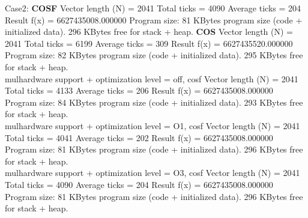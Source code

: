 Case2: 
\textbf{COSF}
Vector length (N)     = 2041
Total ticks           = 4090
Average ticks         = 204
Result f(x)           = 6627435008.000000
Program size: 81 KBytes program size (code + initialized data).
              296 KBytes free for stack + heap.
\textbf{COS}
Vector length (N)     = 2041
Total ticks           = 6199
Average ticks         = 309
Result f(x)           = 6627435520.000000
Program size: 82 KBytes program size (code + initialized data).
              295 KBytes free for stack + heap.
\\
mulhardware support + optimization level = off, cosf
Vector length (N)     = 2041
Total ticks           = 4133
Average ticks         = 206
Result f(x)           = 6627435008.000000
Program size: 84 KBytes program size (code + initialized data).
              293 KBytes free for stack + heap.
\\
mulhardware support + optimization level = O1, cosf
Vector length (N)     = 2041
Total ticks           = 4041
Average ticks         = 202
Result f(x)           = 6627435008.000000
Program size: 81 KBytes program size (code + initialized data).
              296 KBytes free for stack + heap.
\\
mulhardware support + optimization level = O3, cosf
Vector length (N)     = 2041
Total ticks           = 4090
Average ticks         = 204
Result f(x)           = 6627435008.000000
Program size: 81 KBytes program size (code + initialized data).
              296 KBytes free for stack + heap.


